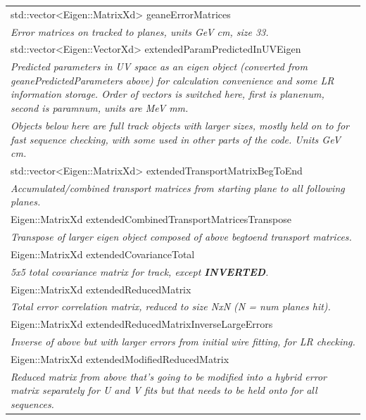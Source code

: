 \documentclass{article}
\begin{document}
\begin{longtable}{|p{16cm}|}
std::vector\textless{}Eigen::MatrixXd\textgreater{} geaneErrorMatrices \\ 
\textit{Error matrices on tracked to planes, units GeV cm, size 33.} \\ \hline

std::vector\textless{}Eigen::VectorXd\textgreater{} extendedParamPredictedInUVEigen \\ 
\textit{Predicted parameters in UV space as an eigen object (converted from geanePredictedParameters above) for calculation convenience and some LR information storage. Order of vectors is switched here, first is planenum, second is paramnum, units are MeV mm.} \\ \hline

\textit{Objects below here are full track objects with larger sizes, mostly held on to for fast sequence checking, with some used in other parts of the code. Units GeV cm.} \\ \hline

std::vector\textless{}Eigen::MatrixXd\textgreater{} extendedTransportMatrixBegToEnd \\
\textit{Accumulated/combined transport matrices from starting plane to all following planes.} \\ \hline

Eigen::MatrixXd extendedCombinedTransportMatricesTranspose \\
\textit{Transpose of larger eigen object composed of above begtoend transport matrices.} \\ \hline

Eigen::MatrixXd extendedCovarianceTotal \\
\textit{5x5 total covariance matrix for track, except \textbf{INVERTED}.} \\ \hline

Eigen::MatrixXd extendedReducedMatrix \\ 
\textit{Total error correlation matrix, reduced to size NxN (N = num planes hit).} \\ \hline

Eigen::MatrixXd extendedReducedMatrixInverseLargeErrors \\ 
\textit{Inverse of above but with larger errors from initial wire fitting, for LR checking.} \\ \hline

Eigen::MatrixXd extendedModifiedReducedMatrix \\ 
\textit{Reduced matrix from above that's going to be modified into a hybrid error matrix separately for U and V fits but that needs to be held onto for all sequences.} \\ \hline

  \hline

\end{longtable}
\end{document}
